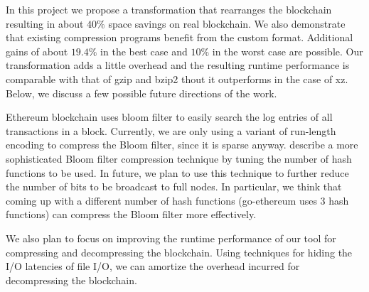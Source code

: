 In this project we propose a transformation that rearranges the \eth{} blockchain resulting in about $40\%$ space savings on real blockchain.
We also demonstrate that existing compression programs benefit from the custom format. Additional gains of about $19.4\%$ in the best case and $10\%$ in the worst case are possible.
Our transformation adds a little overhead and 
the resulting runtime performance is comparable with that of gzip and bzip2 thout it outperforms in the case of xz. 
Below, we discuss a few possible future directions of the work.

Ethereum blockchain uses bloom filter to easily search the log entries of all transactions in a block.
Currently, we are only using a variant of run-length encoding to compress the Bloom filter, since it is sparse anyway. 
\citet{mitzenmacher:2001} describe a more sophisticated Bloom filter compression technique by tuning the number of hash functions to be used. 
In future, we plan to use this technique to further reduce the number of bits to be broadcast to full nodes.
In particular, we think that coming up with a different number of hash functions (go-ethereum uses 3 hash functions) can compress the Bloom filter more effectively.

We also plan to focus on improving the runtime performance of our tool for compressing and decompressing the blockchain.
Using techniques for hiding the I/O latencies of file I/O, we can amortize 
the overhead incurred for decompressing the blockchain.


